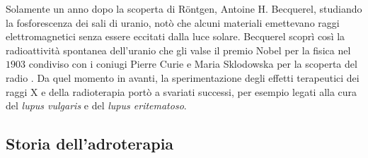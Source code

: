 \documentclass[12pt,a4paper,twoside]{report}
\begin{document}
	Solamente un anno dopo la scoperta di Röntgen, Antoine H. Becquerel, studiando la fosforescenza dei sali di uranio, notò che alcuni materiali emettevano raggi elettromagnetici senza essere eccitati dalla luce solare. Becquerel scoprì così la radioattività spontanea dell'uranio che gli valse il premio Nobel per la fisica nel $1903$ condiviso con i coniugi Pierre Curie e Maria Sklodowska per la scoperta del radio . Da quel momento in avanti, la sperimentazione degli effetti terapeutici dei raggi X e della radioterapia portò a svariati successi, per esempio legati alla cura del \textit{lupus vulgaris} e del \textit{lupus eritematoso}.
	
	\subsection{Storia dell'adroterapia}\label{storia_adroterapia}
	
\end{document}
